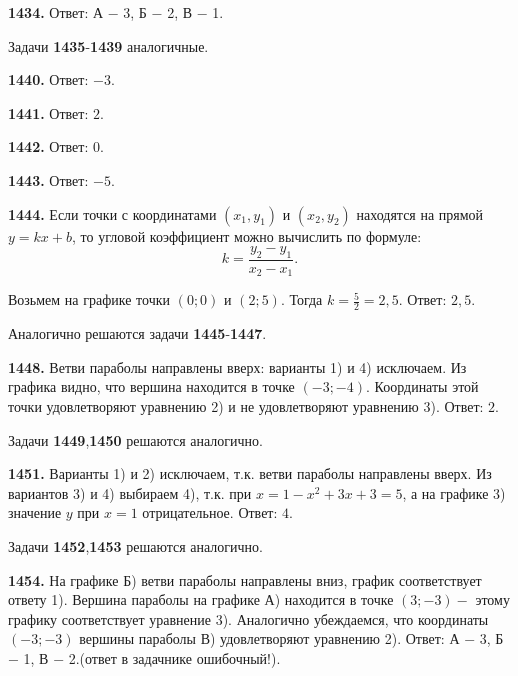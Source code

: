 \textbf{1434.}\newline \null \hspace*{\fill} Ответ: А $-$ 3, Б $-$ 2, В $-$ 1.

Задачи \textbf{1435}-\textbf{1439}  аналогичные.

\textbf{1440.} \newline \null \hspace*{\fill} Ответ: $-3$.   

\textbf{1441.} \newline \null \hspace*{\fill} Ответ: $2$.  

\textbf{1442.} \newline \null \hspace*{\fill} Ответ: $0$.     

\textbf{1443.} \newline \null \hspace*{\fill} Ответ: $-5$.   

\textbf{1444.} Если точки с координатами $(x_1,y_1)$ и $(x_2,y_2)$ находятся на прямой $y=kx+b$, то угловой коэффициент можно вычислить по формуле:$$k=\frac{y_2-y_1}{x_2-x_1}.$$

Возьмем на графике точки $(0;0)$ и $(2;5)$. Тогда $k=\frac{5}{2}=2,5$. \newline \null \hspace*{\fill} Ответ: $2,5$. 

Аналогично решаются задачи \textbf{1445}-\textbf{1447}.

\textbf{1448.} Ветви параболы направлены вверх: варианты  1) и 4) исключаем. Из графика видно, что вершина находится в точке $(-3;-4)$. Координаты этой точки удовлетворяют уравнению 2) и не удовлетворяют уравнению 3). \newline \null \hspace*{\fill} Ответ: $2$. 

Задачи \textbf{1449},\textbf{1450} решаются аналогично.

\textbf{1451.}  Варианты 1) и 2) исключаем, т.к. ветви параболы направлены вверх. Из вариантов 3) и 4) выбираем 4), т.к. при $x=1-x^2+3x+3=5$, а на графике 3) значение $y$ при $x=1$ отрицательное. \newline \null \hspace*{\fill} Ответ: $4$. 

Задачи \textbf{1452},\textbf{1453} решаются аналогично.

\textbf{1454.} На графике Б) ветви параболы направлены вниз, график соответствует ответу 1). Вершина параболы на графике А) находится в точке $(3;-3)-$ этому графику соответствует уравнение 3). Аналогично убеждаемся, что координаты $(-3;-3)$ вершины параболы В) удовлетворяют уравнению  2). \newline \null \hspace*{\fill} Ответ: А $-$ 3, Б $-$ 1, В $-$ 2.(ответ в задачнике ошибочный!). 

